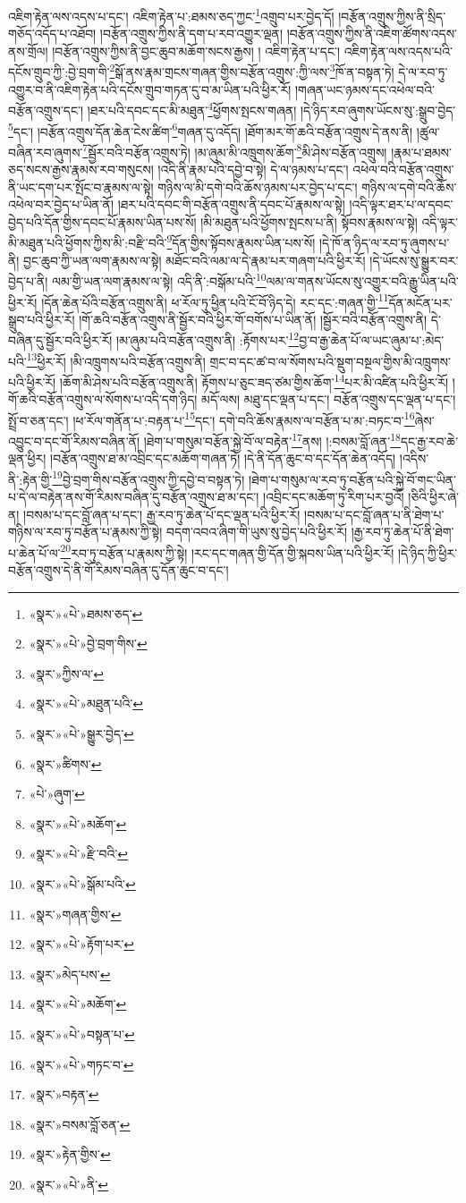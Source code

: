 འཇིག་རྟེན་ལས་འདས་པ་དང་། འཇིག་རྟེན་པ་:ཐམས་ཅད་ཀྱང་\footnote{«སྣར་»«པེ་»ཐམས་ཅད་}འགྲུབ་པར་བྱེད་དོ། །བརྩོན་འགྲུས་ཀྱིས་ནི་སྲིད་གཅོད་འདོད་པ་འཐོབ། །བརྩོན་འགྲུས་ཀྱིས་ནི་དག་པ་རབ་འགྱུར་ལྡན། །བརྩོན་འགྲུས་ཀྱིས་ནི་འཇིག་ཚོགས་འདས་ནས་གྲོལ། །བརྩོན་འགྲུས་ཀྱིས་ནི་བྱང་ཆུབ་མཆོག་སངས་རྒྱས། །
འཇིག་རྟེན་པ་དང་། འཇིག་རྟེན་ལས་འདས་པའི་དངོས་གྲུབ་ཀྱི་:བྱེ་བྲག་གི་\footnote{«སྣར་»«པེ་»བྱེ་བྲག་གིས་}སྒོ་ནས་རྣམ་གྲངས་གཞན་གྱིས་བརྩོན་འགྲུས་:ཀྱི་ལས་\footnote{«སྣར་»ཀྱིས་ལ་}ཁོ་ན་བསྟན་ཏེ། དེ་ལ་རབ་ཏུ་འགྱུར་བ་ནི་འཇིག་རྟེན་པའི་དངོས་གྲུབ་གཏན་དུ་བ་མ་ཡིན་པའི་ཕྱིར་རོ། །གཞན་ཡང་ཉམས་དང་འཕེལ་བའི་བརྩོན་འགྲུས་དང་། །ཐར་པའི་དབང་དང་མི་མཐུན་\footnote{«སྣར་»«པེ་»མཐུན་པའི་}ཕྱོགས་སྤངས་གཞན། །དེ་ཉིད་རབ་ཞུགས་ཡོངས་སུ་:སྒྲུབ་བྱེད་\footnote{«སྣར་»«པེ་»སྒྱུར་བྱེད་}དང་། །བརྩོན་འགྲུས་དོན་ཆེན་ངེས་ཚིག་\footnote{«སྣར་»ཚིགས་}གཞན་དུ་འདོད། །ཐོག་མར་གོ་ཆའི་བརྩོན་འགྲུས་དེ་ནས་ནི། །ཚུལ་བཞིན་རབ་ཞུགས་\footnote{«པེ་»ཞུག་}སྦྱོར་བའི་བརྩོན་འགྲུས་ཏེ། །མ་ཞུམ་མི་འཁྲུགས་ཆོག་\footnote{«སྣར་»«པེ་»མཆོག་}མི་ཤེས་བརྩོན་འགྲུས། །རྣམ་པ་ཐམས་ཅད་སངས་རྒྱས་རྣམས་རབ་གསུངས། །འདི་ནི་རྣམ་པའི་དབྱེ་བ་སྟེ། དེ་ལ་ཉམས་པ་དང་། འཕེལ་བའི་བརྩོན་འགྲུས་ནི་ཡང་དག་པར་སྤོང་བ་རྣམས་ལ་སྟེ། གཉིས་ལ་མི་དགེ་བའི་ཆོས་ཉམས་པར་བྱེད་པ་དང་། གཉིས་ལ་དགེ་བའི་ཆོས་འཕེལ་བར་བྱེད་པ་ཡིན་ནོ། །ཐར་པའི་དབང་གི་བརྩོན་འགྲུས་ནི་དབང་པོ་རྣམས་ལ་སྟེ། །འདི་ལྟར་ཐར་པ་ལ་དབང་བྱེད་པའི་དོན་གྱིས་དབང་པོ་རྣམས་ཡིན་པས་སོ། །མི་མཐུན་པའི་ཕྱོགས་སྤངས་པ་ནི། སྟོབས་རྣམས་ལ་སྟེ། འདི་ལྟར་མི་མཐུན་པའི་ཕྱོགས་ཀྱིས་མི་:བརྫི་བའི་\footnote{«སྣར་»«པེ་»རྫི་བའི་}དོན་གྱིས་སྟོབས་རྣམས་ཡིན་པས་སོ། །དེ་ཁོ་ན་ཉིད་ལ་རབ་ཏུ་ཞུགས་པ་ནི། བྱང་ཆུབ་ཀྱི་ཡན་ལག་རྣམས་ལ་སྟེ། མཐོང་བའི་ལམ་ལ་དེ་རྣམ་པར་གཞག་པའི་ཕྱིར་རོ། །དེ་ཡོངས་སུ་སྒྱུར་བར་བྱེད་པ་ནི། ལམ་གྱི་ཡན་ལག་རྣམས་ལ་སྟེ། འདི་ནི་:བསྒོམ་པའི་\footnote{«སྣར་»«པེ་»སྒོམ་པའི་}ལམ་ལ་གནས་ཡོངས་སུ་འགྱུར་བའི་རྒྱུ་ཡིན་པའི་ཕྱིར་རོ། །དོན་ཆེན་པོའི་བརྩོན་འགྲུས་ནི། ཕ་རོལ་ཏུ་ཕྱིན་པའི་ངོ་བོ་ཉིད་དེ། རང་དང་:གཞན་གྱི་\footnote{«སྣར་»གཞན་གྱིས་}དོན་མངོན་པར་སྒྲུབ་པའི་ཕྱིར་རོ། །གོ་ཆའི་བརྩོན་འགྲུས་ནི་སྦྱོར་བའི་ཕྱིར་གོ་བགོས་པ་ཡིན་ནོ། །སྦྱོར་བའི་བརྩོན་འགྲུས་ནི། དེ་བཞིན་དུ་སྦྱོར་བའི་ཕྱིར་རོ། །མ་ཞུམ་པའི་བརྩོན་འགྲུས་ནི། :རྟོགས་པར་\footnote{«སྣར་»«པེ་»རྟོག་པར་}བྱ་བ་རྒྱ་ཆེན་པོ་ལ་ཡང་ཞུམ་པ་:མེད་པའི་\footnote{«སྣར་»མེད་པས་}ཕྱིར་རོ། །མི་འཁྲུགས་པའི་བརྩོན་འགྲུས་ནི། གྲང་བ་དང་ཚ་བ་ལ་སོགས་པའི་སྡུག་བསྔལ་གྱིས་མི་འཁྲུགས་པའི་ཕྱིར་རོ། །ཆོག་མི་ཤེས་པའི་བརྩོན་འགྲུས་ནི། རྟོགས་པ་ཅུང་ཟད་ཙམ་གྱིས་ཆོག་\footnote{«སྣར་»«པེ་»མཆོག་}པར་མི་འཛིན་པའི་ཕྱིར་རོ། །གོ་ཆའི་བརྩོན་འགྲུས་ལ་སོགས་པ་འདི་དག་ཉིད། མདོ་ལས། མཐུ་དང་ལྡན་པ་དང་། བརྩོན་འགྲུས་དང་ལྡན་པ་དང་། སྤྲོ་བ་ཅན་དང་། །ཕ་རོལ་གནོན་པ་:བརྟན་པ་\footnote{«སྣར་»«པེ་»བསྟན་པ་}དང་། དགེ་བའི་ཆོས་རྣམས་ལ་བརྩོན་པ་མ་:བཏང་བ་\footnote{«སྣར་»«པེ་»གཏང་བ་}ཞེས་འབྱུང་བ་དང་གོ་རིམས་བཞིན་ནོ། །ཐེག་པ་གསུམ་བརྩོན་སྐྱེ་བོ་ལ་བརྟེན་\footnote{«སྣར་»བརྟན་}ནས། །:བསམ་བློ་ཞན་\footnote{«སྣར་»བསམ་བློ་ཅན་}དང་རྒྱ་རབ་ཆེ་ལྡན་ཕྱིར། །བརྩོན་འགྲུས་ཐ་མ་འབྲིང་དང་མཆོག་གཞན་ཏེ། །དེ་ནི་དོན་ཆུང་བ་དང་དོན་ཆེན་འདོད། །འདིས་ནི་:རྟེན་གྱི་\footnote{«སྣར་»རྟེན་གྱིས་}བྱེ་བྲག་གིས་བརྩོན་འགྲུས་ཀྱི་དབྱེ་བ་བསྟན་ཏེ། །ཐེག་པ་གསུམ་ལ་རབ་ཏུ་བརྩོན་པའི་སྐྱེ་བོ་གང་ཡིན་པ་དེ་ལ་བརྟེན་ནས་གོ་རིམས་བཞིན་དུ་བརྩོན་འགྲུས་ཐ་མ་དང་། །འབྲིང་དང་མཆོག་ཏུ་རིག་པར་བྱའོ། །ཅིའི་ཕྱིར་ཞེ་ན། །བསམ་པ་དང་བློ་ཞན་པ་དང་། རྒྱ་རབ་ཏུ་ཆེན་པོ་དང་ལྡན་པའི་ཕྱིར་རོ། །བསམ་པ་དང་བློ་ཞན་པ་ནི་ཐེག་པ་གཉིས་ལ་རབ་ཏུ་བརྩོན་པ་རྣམས་ཀྱི་སྟེ། བདག་འབའ་ཞིག་གི་ཡུས་སུ་བྱེད་པའི་ཕྱིར་རོ། །རྒྱ་རབ་ཏུ་ཆེན་པོ་ནི་ཐེག་པ་ཆེན་པོ་ལ་\footnote{«སྣར་»«པེ་»ནི་}རབ་ཏུ་བརྩོན་པ་རྣམས་ཀྱི་སྟེ། །རང་དང་གཞན་གྱི་དོན་གྱི་སྐབས་ཡིན་པའི་ཕྱིར་རོ། །དེ་ཉིད་ཀྱི་ཕྱིར་བརྩོན་འགྲུས་དེ་ནི་གོ་རིམས་བཞིན་དུ་དོན་ཆུང་བ་དང་། 